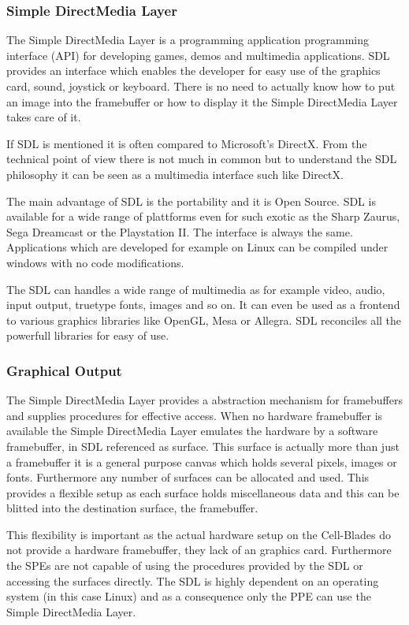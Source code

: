 \documentclass[DIV10, abstracton, openright, footsepline, headsepline, twoside, 9pt,
bigheadings]{scrreprt}
\begin{document}
\subsubsection*{Simple DirectMedia Layer}
The Simple DirectMedia Layer is a programming application programming interface
(API) for developing games, demos and multimedia applications. SDL provides an interface
which enables the developer for easy use of the graphics card, sound, joystick or
keyboard. There is no need to actually know how to put an image into the
framebuffer or how to display it the Simple DirectMedia Layer takes care of it.

If SDL is mentioned it is often compared to Microsoft's DirectX. From the technical
point of view there is not much in common but to understand the SDL philosophy it
can be seen as a multimedia interface such like DirectX.

The main advantage of SDL is the portability and it is Open Source.  SDL is available
for a wide range of plattforms even for such exotic as the Sharp Zaurus, Sega Dreamcast
or the Playstation II. The interface is always the same. Applications which are developed
for example on Linux can be compiled under windows with no code modifications.

The SDL can handles a wide range of multimedia as for example video, audio, input output,
truetype fonts, images and so on. It can even be used as a frontend to various
graphics libraries like OpenGL, Mesa or Allegra. SDL reconciles all the powerfull
libraries for easy of use.


\subsubsection{Graphical Output}
\label{sec:analysis_graph_out}
The Simple DirectMedia Layer provides a abstraction mechanism for framebuffers and
supplies procedures for effective access. When no hardware framebuffer is available
the Simple DirectMedia Layer emulates the hardware by a software framebuffer, in
SDL referenced as surface. This surface is actually more than just a framebuffer it
is  a general purpose canvas which holds several pixels, images or fonts. Furthermore
any number of surfaces can be allocated and used. This provides a flexible
setup as each surface holds miscellaneous data and this can be blitted into the
destination surface, the framebuffer.

This flexibility is important as the actual hardware setup on the Cell-Blades do not
provide a hardware framebuffer, they lack of an graphics card. Furthermore the SPEs
are not capable of using the procedures provided by the SDL or accessing the surfaces
directly. The SDL is highly dependent on an operating system (in this case Linux)
 and as a
consequence only the PPE can use the Simple DirectMedia Layer.
\end{document}
